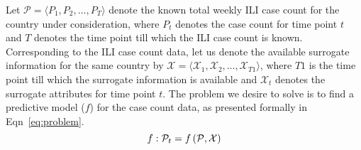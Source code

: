 Let
$\mathcal{P} = \langle {P}_1, {P}_2, \dots,{P}_T \rangle$
denote the known total weekly ILI case count for the country under
consideration, where ${P}_t$  denotes the case count for
time point $t$ and $T$ denotes the time point till which the
ILI case count is known.
Corresponding to the ILI case count data, let us denote the available surrogate information
for the same country by 
$\mathcal{X} = \langle \mathcal{X}_1, \mathcal{X}_2, \dots, \mathcal{X}_{T1}\rangle$, 
where $T1$ is the time point till which the surrogate
information is available and $\mathcal{X}_{t}$ denotes the surrogate attributes for time
point $t$. 
The problem we desire to solve is to find a predictive model ($f$) for the 
case count data, as presented formally in Eqn~\ref{eq:problem}.
\begin{equation}
  \label{eq:problem}
  f: \mathcal{P}_t = f\left(\mathcal{P}, \mathcal{X}\right)
    \vspace{-2em}
\end{equation}


